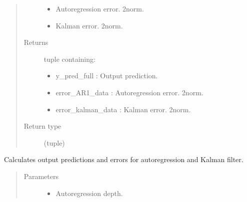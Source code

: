 \documentclass[letterpaper,10pt,english]{sphinxmanual}
\begin{document}
\begin{fulllineitems}
\begin{fulllineitems}
\begin{quote}
\begin{description}
\begin{itemize}
\item {} 
\sphinxAtStartPar
{} \textendash{} Auto\sphinxhyphen{}regression error. 2\sphinxhyphen{}norm.

\item {} 
\sphinxAtStartPar
{} \textendash{} Kalman error. 2\sphinxhyphen{}norm.

\end{itemize}

\item[{Returns}] \leavevmode
\sphinxAtStartPar

\sphinxAtStartPar
tuple containing:
\begin{itemize}
\item {} 
\sphinxAtStartPar
y\_pred\_full       : Output prediction.

\item {} 
\sphinxAtStartPar
error\_AR1\_data    : Auto\sphinxhyphen{}regression error. 2\sphinxhyphen{}norm.

\item {} 
\sphinxAtStartPar
error\_kalman\_data : Kalman error. 2\sphinxhyphen{}norm.

\end{itemize}


\item[{Return type}] \leavevmode
\sphinxAtStartPar
(tuple)

\end{description}\end{quote}

\end{fulllineitems}


\begin{fulllineitems}
\label{\detokenize{LDS.LDS.filters:LDS.LDS.filters.kalman_filtering_siso.KalmanFilteringSISO.predict_kalman}}
\sphinxAtStartPar
Calculates output predictions and errors for auto\sphinxhyphen{}regression and Kalman filter.
\begin{quote}\begin{description}
\item[{Parameters}] \leavevmode\begin{itemize}
\item {} 
\sphinxAtStartPar
{} \textendash{} Auto\sphinxhyphen{}regression depth.


\end{itemize}
\end{description}
\end{quote}
\end{fulllineitems}
\end{fulllineitems}
\end{document}
